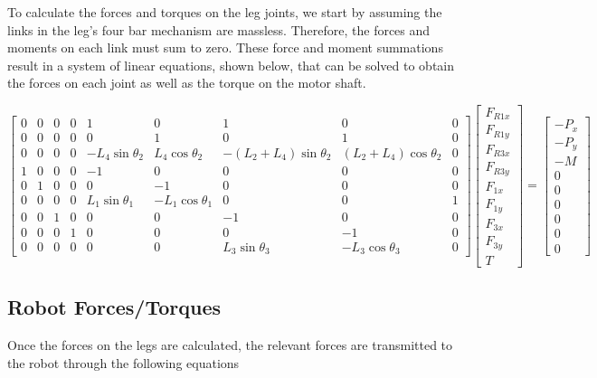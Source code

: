 \documentclass[letterpaper]{article}
\begin{document}
To calculate the forces and torques on the leg joints, we start by assuming the links in the leg's four bar mechanism are massless. Therefore, the forces and moments on each link must sum to zero. These force and moment summations result in a system of linear equations, shown below, that can be solved to obtain the forces on each joint as well as the torque on the motor shaft.

\begin{equation}
\begin{bmatrix}
0 & 0 & 0 & 0 & 1 & 0 & 1 & 0 &0 \\ 
0 & 0 & 0 & 0 & 0 & 1 & 0 & 1 &0 \\
0 & 0 & 0 & 0 &  -L_4 \sin \theta_2 &  L_4 \cos \theta_2& -(L_2 + L_4) \sin \theta_2 & (L_2 + L_4) \cos \theta_2 & 0 \\
1 & 0 & 0 & 0 & -1 & 0 & 0 & 0 & 0 \\
0 & 1 & 0 & 0 & 0 & -1 & 0 & 0 & 0 \\
0 & 0 & 0 & 0 & L_1 \sin \theta_1 & -L_1 \cos \theta_1 & 0 & 0 & 1\\
0 & 0 & 1 & 0 & 0 & 0 & -1 & 0 & 0 \\
0 & 0 & 0 & 1 & 0 & 0 & 0 & -1 & 0 \\
0 & 0 & 0 & 0 & 0 & 0 & L_3 \sin \theta_3 & -L_3 \cos \theta_3 & 0
\end{bmatrix}
\begin{bmatrix} F_{R1x} \\ F_{R1y} \\ F_{R3x} \\ F_{R3y} \\ F_{1x} \\ F_{1y} \\ F_{3x} \\ F_{3y} \\ T \end{bmatrix}
=
\begin{bmatrix} -P_x \\ - P_y \\ -M \\ 0 \\ 0 \\ 0 \\ 0 \\ 0 \\ 0 \end{bmatrix}
\end{equation}

\subsection{Robot Forces/Torques}
Once the forces on the legs are calculated, the relevant forces are transmitted to the robot through the following equations
\end{document}
